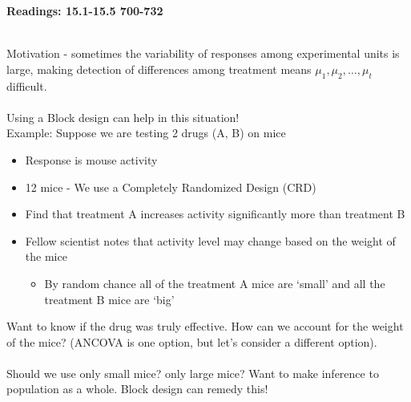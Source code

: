 \begin{center}\large\textbf{Readings: 15.1-15.5 700-732}\\
\normalsize \end{center}
\large \hlinewd{2pt}
~\\

Motivation - sometimes the variability of responses among experimental units is large, making detection of differences among treatment means $\mu_1,\mu_2,\ldots,\mu_t$ difficult.\\~\\
Using a Block design can help in this situation!\\

Example:  Suppose we are testing 2 drugs (A, B) on mice
\begin{itemize}
        \item{Response is mouse activity}
        \item{12 mice - We use a Completely Randomized Design (CRD)}
        \item{Find that treatment A increases activity significantly more than treatment B}
        \item{Fellow scientist notes that activity level may change based on the weight of the mice}
    \begin{itemize}
            \item{By random chance all of the treatment A mice are `small' and all the treatment B mice are `big'}
     \end{itemize}
\end{itemize}

Want to know if the drug was truly effective.  How can we account for the weight of the mice?  (ANCOVA is one option, but let's consider a different option).\\~\\
Should we use only small mice? only large mice?  Want to make inference to population as a whole.  Block design can remedy this!\\~\\

\newpage

